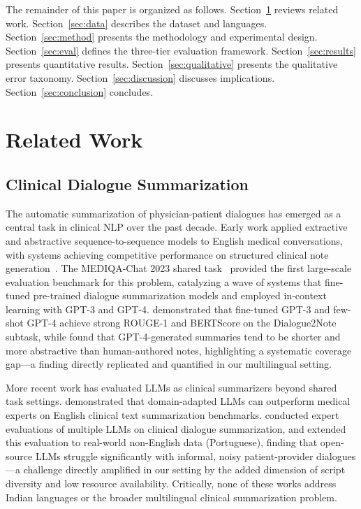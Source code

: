 \documentclass[10pt,twocolumn]{article}
\begin{document}
The remainder of this paper is organized as follows.
Section~\ref{sec:related} reviews related work.
Section~\ref{sec:data} describes the dataset and languages.
Section~\ref{sec:method} presents the methodology and
experimental design.
Section~\ref{sec:eval} defines the three-tier evaluation framework.
Section~\ref{sec:results} presents quantitative results.
Section~\ref{sec:qualitative} presents the qualitative
error taxonomy.
Section~\ref{sec:discussion} discusses implications.
Section~\ref{sec:conclusion} concludes.

\section{Related Work}
\label{sec:related}

\subsection{Clinical Dialogue Summarization}

The automatic summarization of physician-patient dialogues
has emerged as a central task in clinical NLP over the past
decade. Early work applied extractive and abstractive
sequence-to-sequence models to English medical conversations,
with systems achieving competitive performance on structured
clinical note generation~\citep{ben2023mediqa}.
The MEDIQA-Chat 2023 shared task~\citep{ben2023mediqa}
provided the first large-scale evaluation benchmark for this
problem, catalyzing a wave of systems that fine-tuned
pre-trained dialogue summarization models and employed
in-context learning with GPT-3 and GPT-4.
\citet{tang2023gersteinlab} demonstrated that fine-tuned
GPT-3 and few-shot GPT-4 achieve strong ROUGE-1 and BERTScore
on the Dialogue2Note subtask, while
\citet{summqa2023} found that GPT-4-generated summaries
tend to be shorter and more abstractive than human-authored
notes, highlighting a systematic coverage gap---a finding
directly replicated and quantified in our multilingual setting.

More recent work has evaluated LLMs as clinical summarizers
beyond shared task settings.
\citet{vveen2024nat} demonstrated that domain-adapted LLMs
can outperform medical experts on English clinical text
summarization benchmarks.
\citet{expert2025eval} conducted expert evaluations of
multiple LLMs on clinical dialogue summarization,
and \citet{noneng2025qual} extended this evaluation to
real-world non-English data (Portuguese), finding that
open-source LLMs struggle significantly with informal,
noisy patient-provider dialogues---a challenge directly
amplified in our setting by the added dimension of
script diversity and low resource availability.
Critically, none of these works address Indian languages
or the broader multilingual clinical summarization problem.
\end{document}
